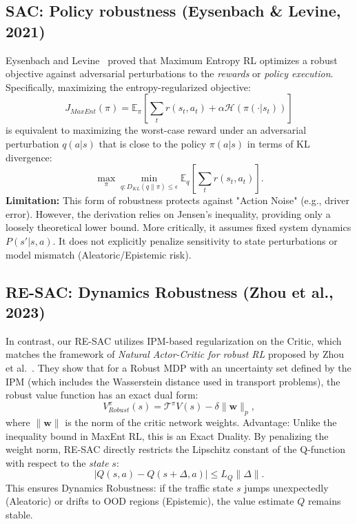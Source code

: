 \subsection{SAC: Policy robustness (Eysenbach \& Levine, 2021)}
Eysenbach and Levine~\cite{Eysenbach2021MaxEnt} proved that Maximum Entropy RL optimizes a robust objective against adversarial perturbations to the \textit{rewards} or \textit{policy execution}.
Specifically, maximizing the entropy-regularized objective:
\begin{equation}
    J_{MaxEnt}(\pi) = \mathbb{E}_{\pi} \left[ \sum_t r(s_t, a_t) + \alpha \mathcal{H}(\pi(\cdot|s_t)) \right]
\end{equation}
is equivalent to maximizing the worst-case reward under an adversarial perturbation $q(a|s)$ that is close to the policy $\pi(a|s)$ in terms of KL divergence:
\begin{equation}
    \max_\pi \min_{q: D_{KL}(q\|\pi) \le \epsilon} \mathbb{E}_{q} [ \sum_t r(s_t, a_t) ].
\end{equation}
\textbf{Limitation:} This form of robustness protects against "Action Noise" (e.g., driver error). However, the derivation relies on Jensen's inequality, providing only a loosely theoretical lower bound. More critically, it assumes fixed system dynamics $P(s'|s,a)$. It does not explicitly penalize sensitivity to state perturbations or model mismatch (Aleatoric/Epistemic risk).

\subsection{RE-SAC: Dynamics Robustness (Zhou et al., 2023)}
In contrast, our RE-SAC utilizes IPM-based regularization on the Critic, which matches the framework of \textit{Natural Actor-Critic for robust RL} proposed by Zhou et al.~\cite{Zhou2023NaturalActorCritic}.
They show that for a Robust MDP with an uncertainty set defined by the IPM (which includes the Wasserstein distance used in transport problems), the robust value function has an exact dual form:
\begin{equation}
    V_{Robust}^\pi(s) = \mathcal{T}^\pi V(s) - \delta \|\mathbf{w}\|_{p},
\end{equation}
where $\|\mathbf{w}\|$ is the norm of the critic network weights.
Advantage: Unlike the inequality bound in MaxEnt RL, this is an Exact Duality. By penalizing the weight norm, RE-SAC directly restricts the Lipschitz constant of the Q-function with respect to the \textit{state} $s$:
\begin{equation}
    |Q(s, a) - Q(s+\Delta, a)| \le L_Q \|\Delta\|.
\end{equation}
This ensures Dynamics Robustness: if the traffic state $s$ jumps unexpectedly (Aleatoric) or drifts to OOD regions (Epistemic), the value estimate $Q$ remains stable.

